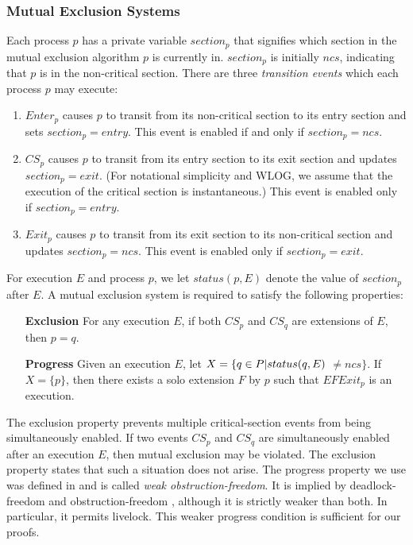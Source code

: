\subsubsection*{Mutual Exclusion Systems}

Each process $p$ has a private variable $section_p$ that signifies which section in the mutual exclusion algorithm $p$ is currently in. $section_p$ is initially $ncs$, indicating that $p$ is in the non-critical section.
There are three \emph{transition events} which each process $p$ may execute:
\begin{enumerate}
	\item $Enter_p$ causes $p$ to transit from its non-critical section to its entry section and sets $section_p = entry$. This event is enabled if and only if $section_p = ncs$.
	\item $CS_p$ causes $p$ to transit from its entry section to its exit section and updates $section_p = exit$. (For notational simplicity and WLOG, we assume that the execution of the critical section is instantaneous.)
	This event is enabled only if $section_p = entry$.
	\item $Exit_p$ causes $p$ to transit from its exit section to its non-critical section and updates $section_p = ncs$. This event is enabled only if $section_p = exit$.
\end{enumerate}

For execution $E$ and process $p$, we let $status(p,E)$ denote the value of $section_p$ after $E$.
A mutual exclusion system is required to satisfy the following properties:

\begin{enumerate}
	\item[\textbf{Exclusion}] For any execution $E$, if both $CS_p$ and $CS_q$ are extensions of $E$, then $p = q$.
	\item[\textbf{Progress}] Given an execution $E$, let $X = \{q \in P | \penalty 0 status(q,E)$ $\neq ncs\}$. If $X = \{p\}$, then there exists a solo extension $F$ by $p$ such that $E F Exit_p$ is an execution.
\end{enumerate}

The exclusion property prevents multiple critical-section events from being simultaneously enabled. If two events $CS_p$ and $CS_q$ are simultaneously enabled after an execution $E$, then mutual exclusion may be violated. The exclusion property states that such a situation does not arise.
The progress property we use was defined in \cite{DBLP:conf/stoc/AttiyaHW08} and is called \emph{weak obstruction-freedom}. It is implied by deadlock-freedom and obstruction-freedom \cite{HLM03}, although it is strictly weaker than both. In particular, it permits livelock. This weaker progress condition is sufficient for our proofs.

